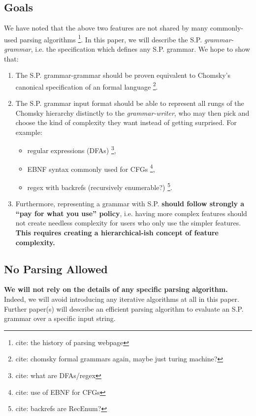 \documentclass[10pt]{article}
\newcommand{\todocite}[1]{\footnote{cite: #1}}
\begin{document}
\subsection{Goals}
\label{sec:goals}
We have noted that the above two features are not shared by many commonly-used parsing algorithms \todocite{the history of parsing webpage}. In this paper, we will describe the S.P. \textit{grammar-grammar}, i.e. the specification which defines any S.P. grammar. We hope to show that:
\begin{enumerate}
  \item The S.P. grammar-grammar should be proven equivalent to Chomsky's canonical specification of an formal language \todocite{chomsky formal grammars again, maybe just turing machine?}.
  \item The S.P. grammar input format should be able to represent all rungs of the Chomsky hierarchy distinctly to the \textit{grammar-writer}, who may then pick and choose the kind of complexity they want instead of getting surprised. For example: \begin{itemize}
      \item regular expressions (DFAs) \todocite{what are DFAs/regex}, \\
      \item EBNF syntax commonly used for CFGs \todocite{use of EBNF for CFGs}, \\
      \item regex with backrefs (recursively enumerable?) \todocite{backrefs are RecEnum?}.
    \end{itemize}
  \item Furthermore, representing a grammar with S.P. \textbf{should follow strongly a ``pay for what you use'' policy}, i.e. having more complex features should not create needless complexity for users who only use the simpler features. \textbf{This requires creating a hierarchical-ish concept of feature complexity.}
\end{enumerate}

\subsection{No Parsing Allowed}
\label{sec:no-parsing-allowed}
\textbf{We will not rely on the details of any specific parsing algorithm.} Indeed, we will avoid introducing any iterative algorithms at all in this paper. Further paper(s) will describe an efficient parsing algorithm to evaluate an S.P. grammar over a specific input string.
\end{document}
